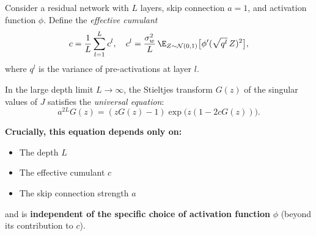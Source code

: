 \begin{theorem}\label{thm:universal-resnet}
Consider a residual network with $L$ layers, skip connection $a = 1$, and activation function $\phi$. Define the \emph{effective cumulant}
\begin{equation}\label{eq:effective-cumulant}
c = \frac{1}{L}\sum_{l=1}^L c^l, \quad c^l = \frac{\sigma_w^2}{L} \, \E_{Z\sim\mathcal{N}(0,1)}\bigl[\phi'(\sqrt{q^l}\,Z)^2\bigr],
\end{equation}
where $q^l$ is the variance of pre-activations at layer $l$.

In the large depth limit $L \to \infty$, the Stieltjes transform $G(z)$ of the singular values of $J$ satisfies the \emph{universal equation}:
\begin{equation}\label{eq:universal}
\boxed{a^{2L} G(z) = (zG(z) - 1) \exp\bigl(z(1 - 2c G(z))\bigr).}
\end{equation}

\textbf{Crucially, this equation depends only on:}
\begin{itemize}
\item The depth $L$
\item The effective cumulant $c$
\item The skip connection strength $a$
\end{itemize}
and is \textbf{independent of the specific choice of activation function} $\phi$ (beyond its contribution to $c$).
\end{theorem}
